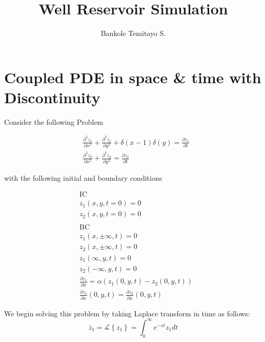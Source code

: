 \documentclass[10pt,a4,fleqn]{article}
\title{Well Reservoir Simulation}
\author{Bankole Temitayo S. }
\begin{document}
\maketitle

\renewcommand{\arraystretch}{1.5}
\renewcommand{\tabcolsep}{0.2cm}

\section{Coupled PDE in space \& time with Discontinuity}

Consider the following Problem

\begin{equation}\label{1}
\begin{aligned}
&\frac{\partial^2 z_1}{\partial x^2} + \frac{\partial^2 z_1}{\partial y^2} +  \delta (x - 1) \delta (y) = \frac{\partial z_1}{\partial t}\\
&\frac{\partial^2 z_2}{\partial x^2} + \frac{\partial^2 z_2}{\partial y^2} = \frac{\partial z_2}{\partial t}
\end{aligned}
\end{equation}

with the following initial and boundary conditions

\begin{equation}
\begin{aligned}
    & \text{IC}\\
    &z_1(x, y, t = 0) = 0\\
    &z_2(x, y, t = 0) = 0\\
    &\text{ }\\
    &\text{BC}\\
    &z_1(x, \pm \infty, t) = 0\\
    &z_2(x, \pm \infty, t) = 0\\
    &z_1(\infty, y, t) = 0\\
    &z_2(-\infty, y, t) = 0\\
    &\frac{\partial z_1}{\partial x} = \alpha \left( z_1\left(0,y, t\right) - z_2\left(0,y,t\right)\right)\\
    &\frac{\partial z_1}{\partial x}(0, y, t) = \frac{\partial z_2}{\partial x}(0,y,t)
\end{aligned}
\end{equation}

We begin solving this problem by taking Laplace transform in time as follows:
\[\bar{z}_1 = \mathscr{L}\left\{{z}_1\right\} = \int_{0}^{\infty} e^{-st}{z}_1 dt\]
\end{document}
